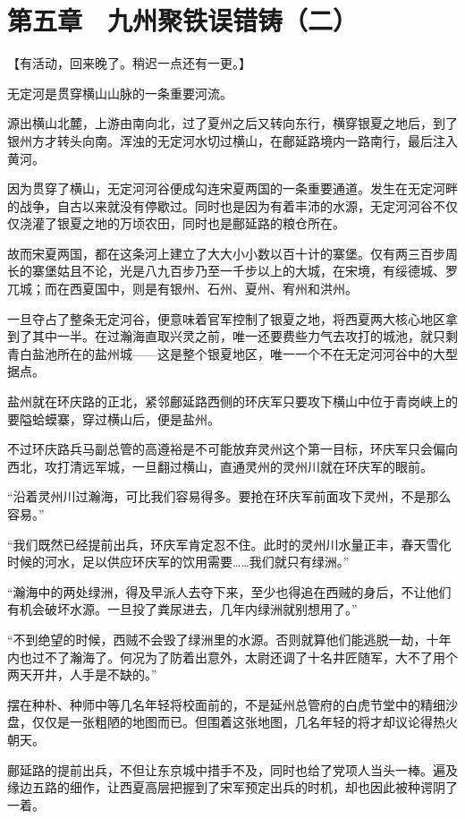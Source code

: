 \section{第五章　九州聚铁误错铸（二）}

【有活动，回来晚了。稍迟一点还有一更。】

无定河是贯穿横山山脉的一条重要河流。

源出横山北麓，上游由南向北，过了夏州之后又转向东行，横穿银夏之地后，到了银州方才转头向南。浑浊的无定河水切过横山，在鄜延路境内一路南行，最后注入黄河。

因为贯穿了横山，无定河河谷便成勾连宋夏两国的一条重要通道。发生在无定河畔的战争，自古以来就没有停歇过。同时也是因为有着丰沛的水源，无定河河谷不仅仅浇灌了银夏之地的万顷农田，同时也是鄜延路的粮仓所在。

故而宋夏两国，都在这条河上建立了大大小小数以百十计的寨堡。仅有两三百步周长的寨堡姑且不论，光是八九百步乃至一千步以上的大城，在宋境，有绥德城、罗兀城；而在西夏国中，则是有银州、石州、夏州、宥州和洪州。

一旦夺占了整条无定河谷，便意味着官军控制了银夏之地，将西夏两大核心地区拿到了其中一半。在过瀚海直取兴灵之前，唯一还要费些力气去攻打的城池，就只剩青白盐池所在的盐州城——这是整个银夏地区，唯一一个不在无定河河谷中的大型据点。

盐州就在环庆路的正北，紧邻鄜延路西侧的环庆军只要攻下横山中位于青岗峡上的要隘蛤蟆寨，穿过横山后，便是盐州。

不过环庆路兵马副总管的高遵裕是不可能放弃灵州这个第一目标，环庆军只会偏向西北，攻打清远军城，一旦翻过横山，直通灵州的灵州川就在环庆军的眼前。

“沿着灵州川过瀚海，可比我们容易得多。要抢在环庆军前面攻下灵州，不是那么容易。”

“我们既然已经提前出兵，环庆军肯定忍不住。此时的灵州川水量正丰，春天雪化时候的河水，足以供应环庆军的饮用需要……我们就只有绿洲。”

“瀚海中的两处绿洲，得及早派人去夺下来，至少也得追在西贼的身后，不让他们有机会破坏水源。一旦投了粪尿进去，几年内绿洲就别想用了。”

“不到绝望的时候，西贼不会毁了绿洲里的水源。否则就算他们能逃脱一劫，十年内也过不了瀚海了。何况为了防着出意外，太尉还调了十名井匠随军，大不了用个两天开井，人手是不缺的。”

摆在种朴、种师中等几名年轻将校面前的，不是延州总管府的白虎节堂中的精细沙盘，仅仅是一张粗陋的地图而已。但围着这张地图，几名年轻的将才却议论得热火朝天。

鄜延路的提前出兵，不但让东京城中措手不及，同时也给了党项人当头一棒。遍及缘边五路的细作，让西夏高层把握到了宋军预定出兵的时机，却也因此被种谔阴了一着。

